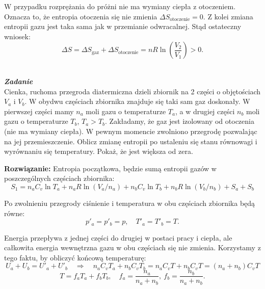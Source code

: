 \documentclass[11pt,a4paper]{article}
\newcounter{zadanie}\newcommand{\zadanie}[1][]{\addtocounter{zadanie}{1} ~\\  {\bf \emph{Zadanie \arabic{zadanie} #1 }} \\}
\begin{document}
W przypadku rozprężania do próżni nie ma wymiany ciepła z otoczeniem. Oznacza to, że entropia otoczenia się nie zmienia $\Delta S_{\textrm{otoczenie}} = 0$. Z kolei zmiana entropii gazu jest taka sama jak w przemianie odwracalnej. Stąd ostateczny wniosek:
\begin{equation}
 \Delta S = \Delta S_{\textrm{gaz}} +  \Delta S_{\textrm{otoczenie}} = n R \ln \left(\frac{V_2}{V_1} \right) > 0.
\end{equation}

\newpage

\zadanie
Cienka, ruchoma przegroda diatermiczna dzieli zbiornik na 2 części o objętościach $V_a$ i $V_b$.
W obydwu częściach zbiornika znajduje się taki sam gaz doskonały.
W pierwszej części mamy $n_a$ moli gazu o temperaturze $T_a$, a w drugiej części $n_b$ moli
gazu o temperaturze $T_b$, $T_a >  T_b$.
Zakładamy, że gaz jest izolowany od otoczenia (nie ma wymiany ciepła).
W pewnym momencie zwolniono przegrodę pozwalając na jej przemieszczenie.
Oblicz zmianę entropii po ustaleniu się stanu równowagi i wyrównaniu się temperatury. 
Pokaż, że jest większa od zera.

\vskip 10pt
\noindent
\textbf{Rozwiązanie:}
Entropia początkowa, będzie sumą entropii gazów w poszczególnych częściach zbiornika:
\begin{equation}
S_1 = n_a C_v \ln T_a  + n_a R \ln (V_a/n_a)  +  
      n_b C_v \ln T_b  + n_b R \ln (V_b/n_b)  + 
      S_{a} + S_{b}
\end{equation}

Po zwolnieniu przegrody ciśnienie i temperatura w obu częściach zbiornika będą równe:
\begin{equation}
p'_a = p'_b = p, \quad T'_a = T'_b = T.
\end{equation}

Energia przepływa z jednej części do drugiej w postaci pracy i ciepła, ale 
całkowita energia wewnętrzna gazu w obu częściach się nie zmienia. Korzystamy z tego
faktu, by obliczyć końcową temperaturę:
\begin{equation}
U_{a} + U_{b} = U'_{a} + U'_{b} \quad \Rightarrow \quad  
n_a C_v T_a + n_b C_v T_b = n_a C_v T + n_b C_v T = (n_a + n_b) C_v T
\end{equation}
\begin{equation}
  T = f_a T_a + f_b T_b, \quad f_a = \frac{n_a}{n_a+n_b},\  f_b = \frac{n_b}{n_a + n_b}.
\end{equation}
\end{document}
